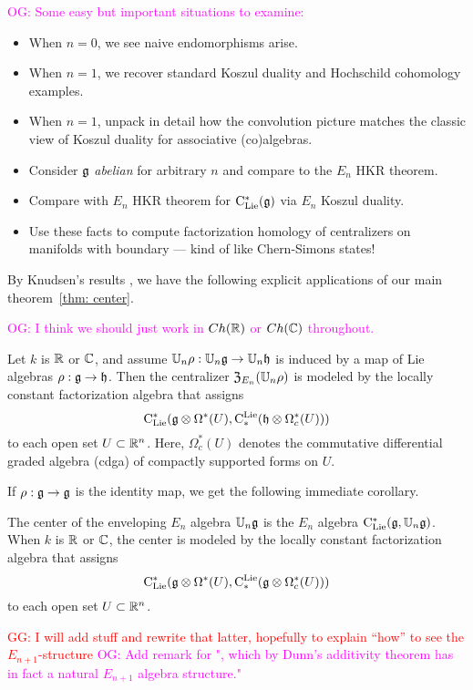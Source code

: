\documentclass[11pt]{amsart}
\numberwithin{equation}{section}
\def\owen{\textcolor{magenta}{OG: }\textcolor{magenta}}
\def\greg{\textcolor{red}{GG: }\textcolor{red}}
\begin{document}
\owen{Some easy but important situations to examine:}
\begin{itemize}
\item When $n=0$, we see naive endomorphisms arise.
\item When $n=1$, we recover standard Koszul duality and Hochschild cohomology examples.
\item When $n=1$, unpack in detail how the convolution picture matches the classic view of Koszul duality for associative (co)algebras.
\item Consider $\mathfrak g$ {\em abelian} for arbitrary $n$ and compare to the $E_n$ HKR theorem.
\item Compare with $E_n$ HKR theorem for ${\rm C}_{\rm Lie}^*(\mathfrak g)$ via $E_n$ Koszul duality.
\item Use these facts to compute factorization homology of centralizers on manifolds with boundary --- kind of like Chern-Simons states!
\end{itemize}


By Knudsen's results \cite{Knudsen}, we have the following explicit applications of our main theorem~\ref{thm: center}.

\owen{I think we should just work in $Ch(\mathbb R)$ or $Ch(\mathbb C)$ throughout.}

\begin{cor}\label{cor:centerfactorization}
Let $k$ is $\mathbb R$ or $\mathbb C$, and assume $\mathbb U_n \rho:  \mathbb U_n \mathfrak g \to \mathbb U_n \mathfrak h$ is induced by a map of Lie algebras $\rho: \mathfrak g \to \mathfrak h$. 
Then the centralizer ${\frak Z}_{E_n}(\mathbb U_n \rho)$ is modeled by the locally constant factorization algebra that assigns
\[
{\rm C}_{\rm Lie}^*(\mathfrak g \otimes \Omega^*(U), {\rm C}^{\rm Lie}_*( \mathfrak h \otimes \Omega^*_c(U)))
\]
to each open set $U \subset \mathbb R^n$. Here, $\Omega^*_c(U)$ denotes the commutative differential graded algebra (cdga) of compactly supported forms on $U$.
\end{cor}

If $\rho: \mathfrak g \to \mathfrak g$ is the identity map, we get the following immediate corollary.

\begin{cor}
\label{thm: center}
The center of the enveloping $E_n$ algebra $\mathbb U_n\mathfrak g$ is the $E_n$ algebra ${\rm C}_{\rm Lie}^*(\mathfrak g, \mathbb U_n\mathfrak g)$. 
When $k$ is $\mathbb R$ or $\mathbb C$, the 
center is modeled by the locally constant factorization algebra that assigns
\[
{\rm C}_{\rm Lie}^*(\mathfrak g \otimes \Omega^*(U), {\rm C}^{\rm Lie}_*( \mathfrak g \otimes \Omega^*_c(U)))
\]
to each open set $U \subset \mathbb R^n$.
\end{cor}
\greg{I will add stuff and rewrite that latter, hopefully to explain ``how'' to see the $E_{n+1}$-structure}
\owen{Add remark for ", which by Dunn's additivity theorem has in fact a natural $E_{n+1}$ algebra structure."}
\end{document}
